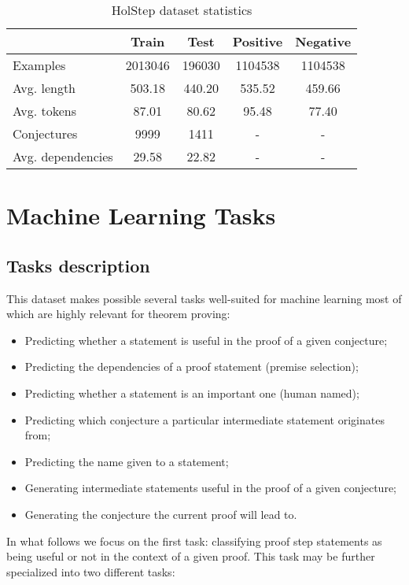 \documentclass[]{article}
\begin{document}
\begin{table}[htb]
  \centering
\setlength{\tabcolsep}{3mm}
\begin{tabular}{lcccc} \toprule
                    & Train & Test & Positive & Negative \\ \midrule
  Examples          & 2013046 & 196030 & 1104538 & 1104538 \\
  Avg. length       & 503.18 & 440.20 & 535.52 & 459.66 \\
  Avg. tokens       & 87.01 & 80.62 & 95.48 & 77.40 \\
  Conjectures       & 9999 & 1411 & - & - \\
  Avg. dependencies & 29.58 & 22.82 & - & - \\ \bottomrule
\end{tabular}
  \caption{HolStep dataset statistics}
  \label{tab:stats}
\end{table}

\section{Machine Learning Tasks}\label{s:tasks}

\subsection{Tasks description}

This dataset makes possible several tasks well-suited for machine
learning most of which are highly relevant for theorem proving:

\begin{itemize}
\item
  Predicting whether a statement is useful in the proof
  of a given conjecture;
\item
  Predicting the dependencies of a proof statement (premise selection);
\item
  Predicting whether a statement is an important one (human named);
\item
  Predicting which conjecture a particular intermediate statement
  originates from;
\item
  Predicting the name given to a statement;
\item
  Generating intermediate statements useful in the proof of a given
  conjecture; \item
  Generating the conjecture the current proof will lead to.
\end{itemize}

In what follows we focus on the first task: classifying proof step
statements as being useful or not in the context of a given proof. This
task may be further specialized into two different tasks:
\end{document}
